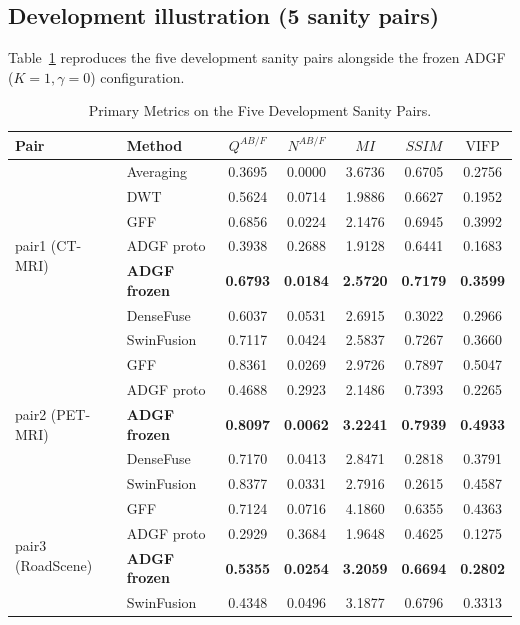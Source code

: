 \documentclass[conference]{IEEEtran}
\begin{document}
\subsection{Development illustration (5 sanity pairs)}
Table~\ref{tab:sanity5} reproduces the five development sanity pairs alongside the frozen ADGF ($K=1, \gamma=0$) configuration.
\begin{table}[htbp]
\caption{Primary Metrics on the Five Development Sanity Pairs.}
\label{tab:sanity5}
\centering
\scriptsize
\begin{tabular}{llccccc}
\toprule
\textbf{Pair} & \textbf{Method} & $Q^{AB/F}$ & $N^{AB/F}$ & $MI$ & $SSIM$ & $\mathrm{VIFP}$ \\
\midrule
\multirow{7}{*}{pair1 (CT-MRI)}
& Averaging & 0.3695 & 0.0000 & 3.6736 & 0.6705 & 0.2756 \\
& DWT & 0.5624 & 0.0714 & 1.9886 & 0.6627 & 0.1952 \\
& GFF & 0.6856 & 0.0224 & 2.1476 & 0.6945 & 0.3992 \\
& ADGF proto & 0.3938 & 0.2688 & 1.9128 & 0.6441 & 0.1683 \\
& \textbf{ADGF frozen} & \textbf{0.6793} & \textbf{0.0184} & \textbf{2.5720} & \textbf{0.7179} & \textbf{0.3599} \\
& DenseFuse & 0.6037 & 0.0531 & 2.6915 & 0.3022 & 0.2966 \\
& SwinFusion & 0.7117 & 0.0424 & 2.5837 & 0.7267 & 0.3660 \\
\midrule
\multirow{5}{*}{pair2 (PET-MRI)}
& GFF & 0.8361 & 0.0269 & 2.9726 & 0.7897 & 0.5047 \\
& ADGF proto & 0.4688 & 0.2923 & 2.1486 & 0.7393 & 0.2265 \\
& \textbf{ADGF frozen} & \textbf{0.8097} & \textbf{0.0062} & \textbf{3.2241} & \textbf{0.7939} & \textbf{0.4933} \\
& DenseFuse & 0.7170 & 0.0413 & 2.8471 & 0.2818 & 0.3791 \\
& SwinFusion & 0.8377 & 0.0331 & 2.7916 & 0.2615 & 0.4587 \\
\midrule
\multirow{4}{*}{pair3 (RoadScene)}
& GFF & 0.7124 & 0.0716 & 4.1860 & 0.6355 & 0.4363 \\
& ADGF proto & 0.2929 & 0.3684 & 1.9648 & 0.4625 & 0.1275 \\
& \textbf{ADGF frozen} & \textbf{0.5355} & \textbf{0.0254} & \textbf{3.2059} & \textbf{0.6694} & \textbf{0.2802} \\
& SwinFusion & 0.4348 & 0.0496 & 3.1877 & 0.6796 & 0.3313 \\
\midrule

\end{tabular}
\end{table}
\end{document}
